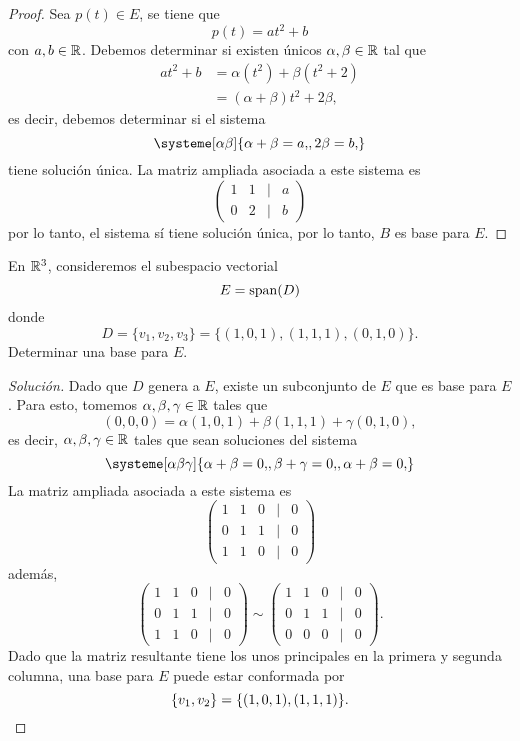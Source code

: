 \documentclass[a4,11pt]{aleph-notas}
\begin{document}
\begin{proof}
    Sea $p(t)\in E$, se tiene que
    \[
        p(t) = at^2+b
    \]
    con $a,b\in\mathbb{R}$. Debemos determinar si existen únicos $\alpha,\beta\in\mathbb{R}$ tal que
    \begin{align*}
        at^2+b 
            & = \alpha(t^2)+\beta(t^2+2)\\
            & = (\alpha+\beta)t^2 + 2\beta,
    \end{align*}
    es decir, debemos determinar si el sistema
    \[
        \systeme[\alpha\beta]{
            \alpha+\beta = a{,},
            2\beta = b{,}
        }
    \]
    tiene solución única. La matriz ampliada asociada a este sistema es
    \[
        \begin{pmatrix}
            1 & 1 & | & a\\
            0 & 2 & | & b
        \end{pmatrix}
    \]
    por lo tanto, el sistema sí tiene solución única, por lo tanto, $B$ es base para $E$.
\end{proof}


\begin{ejer}
    En $\mathbb{R}^3$, consideremos el subespacio vectorial
    \[
        E = \operatorname{span}(D)
    \]
    donde
    \[
        D = \{v_1,v_2,v_3\} = \{(1,0,1), (1,1,1), (0,1,0)\}.
    \]
    Determinar una base para $E$.
\end{ejer}

\begin{proof}[Solución]
    Dado que $D$ genera a $E$, existe un subconjunto de $E$ que es base para $E$. Para esto, tomemos $\alpha,\beta,\gamma\in\mathbb{R}$ tales que
    \[
        (0,0,0) = \alpha(1,0,1)+\beta(1,1,1)+\gamma(0,1,0),
    \]
    es decir, $\alpha,\beta,\gamma\in\mathbb{R}$ tales que sean soluciones del sistema
    \[
        \systeme[\alpha\beta\gamma]{
        \alpha + \beta = 0{,},
        \beta+\gamma = 0{,},
        \alpha + \beta = 0{,}
        }
    \]
    La matriz ampliada asociada a este sistema es
    \[
        \begin{pmatrix}
            1 & 1 & 0 & | & 0\\
            0 & 1 & 1 & | & 0\\
            1 & 1 & 0 & | & 0
        \end{pmatrix}
    \]
    además,
    \[
        \begin{pmatrix}
            1 & 1 & 0 & | & 0\\
            0 & 1 & 1 & | & 0\\
            1 & 1 & 0 & | & 0
        \end{pmatrix}
        \sim
        \begin{pmatrix}
            1 & 1 & 0 & | & 0\\
            0 & 1 & 1 & | & 0\\
            0 & 0 & 0 & | & 0
        \end{pmatrix}.
    \]
    Dado que la matriz resultante tiene los unos principales en la primera y segunda columna, una base para $E$ puede estar conformada por
    \[
        \{v_1,v_2\}=\{(1,0,1), (1,1,1)\}.\qedhere
    \]
\end{proof}
\end{document}
